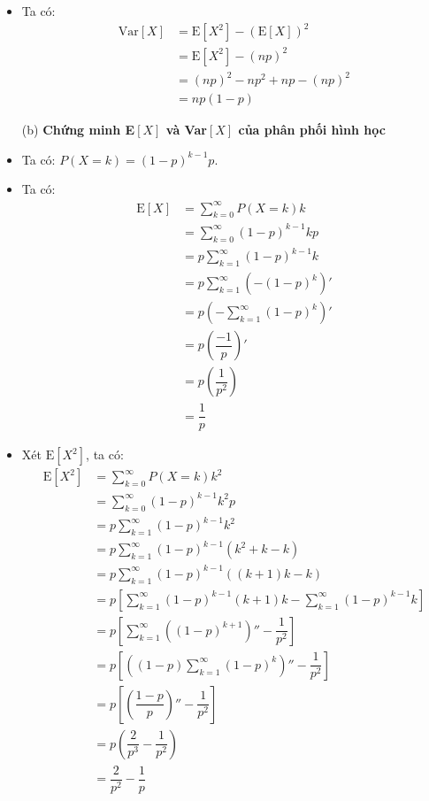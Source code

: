 \documentclass[12pt, a4paper]{article}
\begin{document}
\begin{itemize}
    \item Ta có:
    $$
    \begin{aligned}
        \text{Var}[X] &= \text{E}[X^2] - (\text{E}[X])^2 \\
        &= \text{E}[X^2] - (np)^2 \\
        &= (np)^2 - np^2 + np - (np)^2 \\
        &= np(1-p)
    \end{aligned}
    $$

    \item[(b)] \textbf{Chứng minh E$[X]$ và Var$[X]$ của phân phối hình học}

    \item Ta có: $P(X = k) = (1-p)^{k-1}p$.

    \item Ta có:
    $$
    \begin{aligned}
    \text{E}[X] &= \sum_{k=0}^{\infty} P(X = k) k \\
    &= \sum_{k=0}^{\infty} (1-p)^{k-1}kp \\
    &= p\sum_{k=1}^{\infty} (1-p)^{k-1}k \\
    &= p \sum_{k=1}^{\infty} (-(1-p)^{k})' \\
    &= p \left( -\sum_{k=1}^{\infty} (1-p)^{k} \right)' \\
    &= p \left( \dfrac{-1}{p} \right)' \\
    &= p \left(\dfrac{1}{p^2} \right) \\
    &= \dfrac{1}{p}
    \end{aligned}
    $$

    \item Xét $\text{E}[X^2]$, ta có:
    $$
    \begin{aligned}
        \text{E}[X^2] &= \sum_{k=0}^{\infty} P(X=k)k^2 \\
        &= \sum_{k=0}^{\infty} (1-p)^{k-1}k^2p \\
        &= p\sum_{k=1}^{\infty} (1-p)^{k-1}k^2 \\
        &= p\sum_{k=1}^{\infty} (1-p)^{k-1}(k^2 + k - k) \\
        &= p\sum_{k=1}^{\infty} (1-p)^{k-1}((k+1)k - k) \\
        &= p \left[ \sum_{k=1}^{\infty} (1-p)^{k-1}(k+1)k - \sum_{k=1}^{\infty} (1-p)^{k-1}k \right] \\
        &= p \left[ \sum_{k=1}^{\infty} \left( (1-p)^{k+1} \right)''  - \dfrac{1}{p^2} \right] \\
        &= p \left[ \left( (1-p)\sum_{k=1}^{\infty} (1-p)^k \right)'' - \dfrac{1}{p^2} \right] \\
        &= p \left[ \left( \dfrac{1-p}{p} \right)'' - \dfrac{1}{p^2} \right] \\
        &= p \left( \dfrac{2}{p^3} - \dfrac{1}{p^2} \right) \\
        &= \dfrac{2}{p^2} - \dfrac{1}{p}
    \end{aligned}
    $$


\end{itemize}
\end{document}
